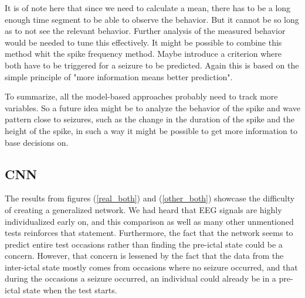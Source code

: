 
It is of note here that since we need to calculate a mean, there has to be a long enough time segment to be able to observe the behavior. But it cannot be so long as to not see the relevant behavior. Further analysis of the measured behavior would be needed to tune this effectively. It might be possible to combine this method whit the spike frequency method. Maybe introduce a criterion where both have to be triggered for a seizure to be predicted. Again this is based on the simple principle of "more information means better prediction". 

To summarize, all the model-based approaches probably need to track more variables. So a future idea might be to analyze the behavior of the spike and wave pattern close to seizures, such as the change in the duration of the spike and the height of the spike, in such a way it might be possible to get more information to base decisions on.


\subsection{CNN}
The results from figures (\ref{real_both}) and (\ref{other_both}) showcase the difficulty of creating a generalized network. We had heard that EEG signals are highly individualized early on, and this comparison as well as many other unmentioned tests reinforces that statement. Furthermore, the fact that the network seems to predict entire test occasions rather than finding the pre-ictal state could be a concern. However, that concern is lessened by the fact that the data from the inter-ictal state mostly comes from occasions where no seizure occurred, and that during the occasions a seizure occurred, an individual could already be in a pre-ictal state when the test starts. \\

